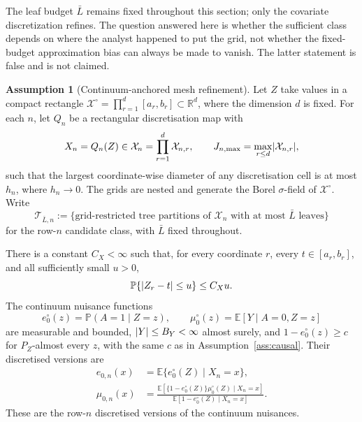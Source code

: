 \documentclass[11pt]{article}
\theoremstyle{plain}
\theoremstyle{definition}
\newtheorem{assumption}{Assumption}
\theoremstyle{remark}
\newcommand{\E}{\mathbb{E}}
\newcommand{\PP}{\mathbb{P}}
\newcommand{\R}{\mathbb{R}}
\newcommand{\cX}{\mathcal{X}}
\newcommand{\cT}{\mathcal{T}}
\newcommand{\ez}{e_0}
\newcommand{\mz}{\mu_0}
\DeclarePairedDelimiter{\abs}{\lvert}{\rvert}
\DeclarePairedDelimiter{\card}{\lvert}{\rvert}
\newcommand{\ezn}{e_{0,n}}
\newcommand{\mzn}{\mu_{0,n}}
\begin{document}
The leaf budget $\bar L$ remains fixed throughout this section; only the
covariate discretization refines. The question answered here is whether the
sufficient class depends on where the analyst happened to put the grid, not
whether the fixed-budget approximation bias can always be made to vanish.
The latter statement is false and is not claimed.

\begin{assumption}[Continuum-anchored mesh refinement]\label{ass:mesh}
Let $Z$ take values in a compact rectangle
$\cX^\circ=\prod_{r=1}^{d}[a_r,b_r]\subset\R^d$, where the dimension $d$ is
fixed. For each $n$, let $Q_n$ be a rectangular discretisation map with
\[
  X_n=Q_n(Z)\in\cX_n=\prod_{r=1}^{d}\cX_{n,r},
  \qquad
  J_{n,\max}=\max_{r\le d}\card{\cX_{n,r}},
\]
such that the largest coordinate-wise diameter of any discretisation cell is
at most $h_n$, where $h_n\longrightarrow0$. The grids are nested and
generate the Borel $\sigma$-field of $\cX^\circ$. Write
\[
  \cT_{\bar L,n}
  :=\{\text{grid-restricted tree partitions of $\cX_n$ with at most
  $\bar L$ leaves}\}
\]
for the row-$n$ candidate class, with $\bar L$ fixed throughout.

There is a constant $C_X<\infty$ such that, for every coordinate $r$, every
$t\in[a_r,b_r]$, and all sufficiently small $u>0$,
\begin{equation}\label{eq:mesh-slab}
  \PP\{\abs{Z_r-t}\le u\}\le C_Xu .
\end{equation}
The continuum nuisance functions
\[
  \ez^\circ(z)=\PP(A=1\mid Z=z),
  \qquad
  \mz^\circ(z)=\E[Y\mid A=0,Z=z]
\]
are measurable and bounded, $\abs{Y}\le B_Y<\infty$ almost surely, and
$1-\ez^\circ(z)\ge c$ for $P_Z$-almost every $z$, with the same $c$ as in
Assumption~\ref{ass:causal}. Their discretised versions are
\begin{align}
  \ezn(x)
  &=\E\{\ez^\circ(Z)\mid X_n=x\},
  \label{eq:mesh-en}\\
  \mzn(x)
  &=\frac{\E[\{1-\ez^\circ(Z)\}\mz^\circ(Z)\mid X_n=x]}
          {\E[1-\ez^\circ(Z)\mid X_n=x]} .
  \label{eq:mesh-mun}
\end{align}
These are the row-$n$ discretised versions of the continuum nuisances.


\end{assumption}
\end{document}
